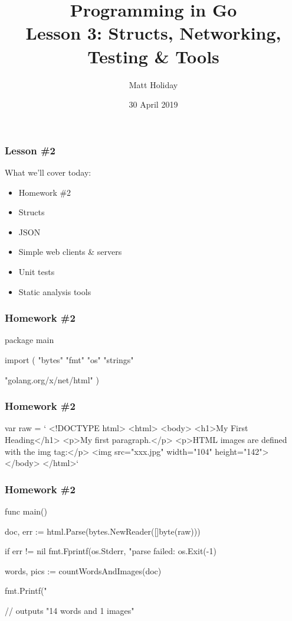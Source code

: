 \documentclass[handout,compress,t,11pt]{beamer}
\title[Programming in Go]{\bf Programming in Go\\ Lesson 3: Structs, Networking, Testing \& Tools}
\author{Matt Holiday}
\institute[CP]{Cardinal Peak}
\date{30 April 2019}
\begin{document}
\frame{\titlepage} 

\begin{frame}[fragile]
    \frametitle{Lesson \#2}
    What we'll cover today:
    \begin{itemize}
    \item Homework \#2
    \item Structs
    \item JSON
    \item Simple web clients \& servers
    \item Unit tests
    \item Static analysis tools
    \end{itemize}
\end{frame}


\begin{frame}[fragile]
\frametitle{Homework \#2}
\begin{golang}
package main

import (
    "bytes"
    "fmt"
    "os"
    "strings"

    "golang.org/x/net/html"
)
\end{golang}
\end{frame}

\begin{frame}[fragile]
\frametitle{Homework \#2}
\begin{golang}
var raw = `
<!DOCTYPE html>
<html>
  <body>
    <h1>My First Heading</h1>
      <p>My first paragraph.</p>
      <p>HTML images are defined with the img tag:</p>
      <img src="xxx.jpg" width="104" height="142">
  </body>
</html>`
\end{golang}
\end{frame}

\begin{frame}[fragile]
\frametitle{Homework \#2}
\begin{golang}
func main() {
    doc, err := html.Parse(bytes.NewReader([]byte(raw)))

    if err != nil {
        fmt.Fprintf(os.Stderr, "parse failed: %
        os.Exit(-1)
    }

    words, pics := countWordsAndImages(doc)

    fmt.Printf("%
}

// outputs "14 words and 1 images"
\end{golang}
\end{frame}
\end{document}
